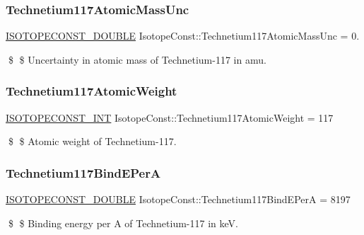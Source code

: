 \subsubsection{\texorpdfstring{Technetium117\+Atomic\+Mass\+Unc}{Technetium117AtomicMassUnc}}
{\footnotesize\ttfamily \mbox{\hyperlink{group___isotope_const-_macros_ga8f45a7272ce02c0b4c65c44636ed719a}{I\+S\+O\+T\+O\+P\+E\+C\+O\+N\+S\+T\+\_\+\+D\+O\+U\+B\+LE}} Isotope\+Const\+::\+Technetium117\+Atomic\+Mass\+Unc = 0.}

\$ \$ Uncertainty in atomic mass of Technetium-\/117 in amu. \mbox{\label{group___isotope_const-_technetium-_tc117_gac96ed3d25f612852d054ac1f35054216}} 
\subsubsection{\texorpdfstring{Technetium117\+Atomic\+Weight}{Technetium117AtomicWeight}}
{\footnotesize\ttfamily \mbox{\hyperlink{group___isotope_const-_macros_ga5f18360b3e99483a35c32d789e62621c}{I\+S\+O\+T\+O\+P\+E\+C\+O\+N\+S\+T\+\_\+\+I\+NT}} Isotope\+Const\+::\+Technetium117\+Atomic\+Weight = 117}

\$ \$ Atomic weight of Technetium-\/117. \mbox{\label{group___isotope_const-_technetium-_tc117_ga9e09305b7826761a13e90707399f8c22}} 
\subsubsection{\texorpdfstring{Technetium117\+Bind\+E\+PerA}{Technetium117BindEPerA}}
{\footnotesize\ttfamily \mbox{\hyperlink{group___isotope_const-_macros_ga8f45a7272ce02c0b4c65c44636ed719a}{I\+S\+O\+T\+O\+P\+E\+C\+O\+N\+S\+T\+\_\+\+D\+O\+U\+B\+LE}} Isotope\+Const\+::\+Technetium117\+Bind\+E\+PerA = 8197}

\$ \$ Binding energy per A of Technetium-\/117 in keV. \mbox{\label{group___isotope_const-_technetium-_tc117_ga25f58ef5a7fe6e13fc08090ab7d6ce2f}} 
